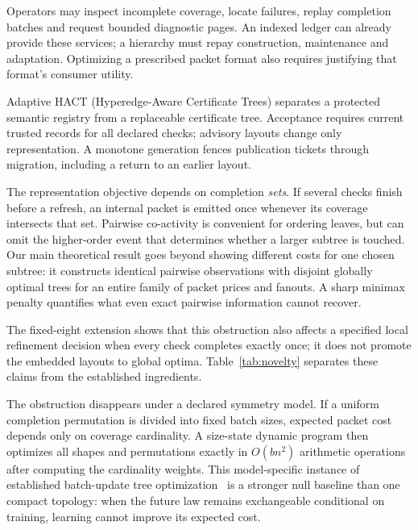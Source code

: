 \documentclass[10pt,journal,compsoc]{IEEEtran}
\theoremstyle{definition}\newtheorem{definition}[theorem]{Definition}
\begin{document}
Operators may inspect incomplete coverage, locate failures, replay completion
batches and request bounded diagnostic pages. An indexed ledger can already
provide these services; a hierarchy must repay construction, maintenance and
adaptation. Optimizing a prescribed packet format also requires justifying
that format's consumer utility.

Adaptive HACT (Hyperedge-Aware Certificate Trees) separates a protected
semantic registry from a replaceable certificate tree. Acceptance requires
current trusted records for all declared checks; advisory layouts change
only representation. A monotone generation fences publication tickets
through migration, including a return to an earlier layout.

The representation objective depends on completion \emph{sets}. If several
checks finish before a refresh, an internal packet is emitted once whenever
its coverage intersects that set. Pairwise co-activity is convenient for
ordering leaves, but can omit the higher-order event that determines whether
a larger subtree is touched. Our main theoretical result goes beyond
showing different costs for one chosen subtree: it constructs identical
pairwise observations with disjoint globally optimal trees for an entire
family of packet prices and fanouts. A sharp minimax penalty quantifies
what even exact pairwise information cannot recover.

The fixed-eight extension shows that this obstruction also affects a
specified local refinement decision when every check completes exactly once;
it does not promote the embedded layouts to global optima. Table~\ref{tab:novelty}
separates these claims from the established ingredients.

The obstruction disappears under a declared symmetry model. If a uniform
completion permutation is divided into fixed batch sizes, expected packet
cost depends only on coverage cardinality. A size-state dynamic program
then optimizes all shapes and permutations exactly in $O(bn^2)$ arithmetic
operations after computing the cardinality weights. This model-specific instance of established batch-update tree
optimization~\cite{graham2007} is a stronger null baseline than one compact
topology: when the future law remains exchangeable conditional on training,
learning cannot improve its expected cost.
\end{document}
